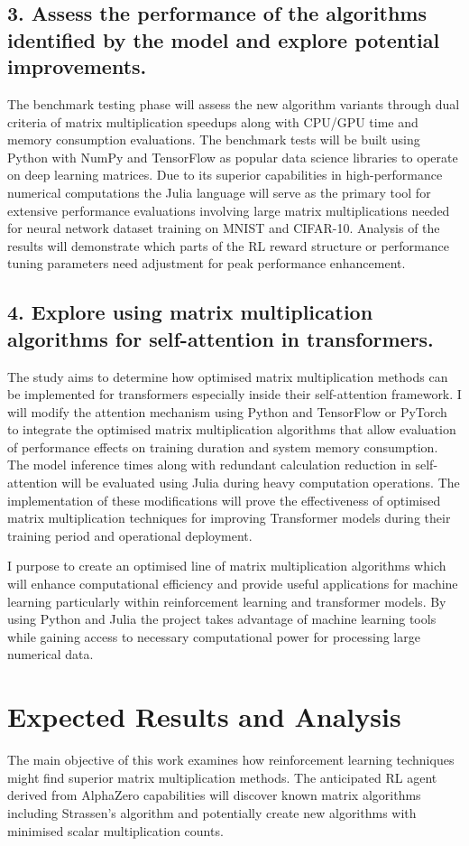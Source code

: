 \documentclass{article}
\begin{document}
\subsection*{3. Assess the performance of the algorithms identified by the model and explore potential improvements.}
The benchmark testing phase will assess the new algorithm variants through dual criteria of matrix multiplication speedups along with CPU/GPU time and memory consumption evaluations. The benchmark tests will be built using Python with NumPy and TensorFlow as popular data science libraries to operate on deep learning matrices. Due to its superior capabilities in high-performance numerical computations the Julia language will serve as the primary tool for extensive performance evaluations involving large matrix multiplications needed for neural network dataset training on MNIST and CIFAR-10. Analysis of the results will demonstrate which parts of the RL reward structure or performance tuning parameters need adjustment for peak performance enhancement.

\subsection*{4. Explore using matrix multiplication algorithms for self-attention in transformers.}
The study aims to determine how optimised matrix multiplication methods can be implemented for transformers especially inside their self-attention framework. I will modify the attention mechanism using Python and TensorFlow or PyTorch to integrate the optimised matrix multiplication algorithms that allow evaluation of performance effects on training duration and system memory consumption. The model inference times along with redundant calculation reduction in self-attention will be evaluated using Julia during heavy computation operations. The implementation of these modifications will prove the effectiveness of optimised matrix multiplication techniques for improving Transformer models during their training period and operational deployment.

I purpose to create an optimised line of matrix multiplication algorithms which will enhance computational efficiency and provide useful applications for machine learning particularly within reinforcement learning and transformer models. By using Python and Julia the project takes advantage of machine learning tools while gaining access to necessary computational power for processing large numerical data.

\section{Expected Results and Analysis}
The main objective of this work examines how reinforcement learning techniques might find superior matrix multiplication methods. The anticipated RL agent derived from AlphaZero capabilities will discover known matrix algorithms including Strassen's algorithm and potentially create new algorithms with minimised scalar multiplication counts.
\end{document}
